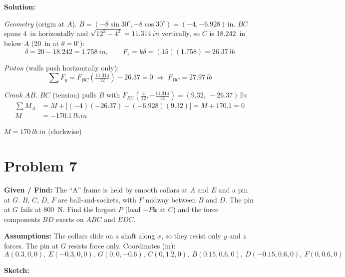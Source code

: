 \documentclass[11pt]{article}
\newcommand{\problemhead}[2]{%
    \clearpage
    \section*{Problem #1}
    \textbf{Given / Find:} #2
}
\begin{document}
\textbf{Solution:}

\textit{Geometry} (origin at $A$). $B = (-8\sin30^\circ, -8\cos30^\circ) = (-4, -6.928)$\,in. $BC$ spans \SI{4}{in} horizontally and $\sqrt{12^2 - 4^2} = \SI{11.314}{in}$ vertically, so $C$ is \SI{18.242}{in} below $A$ (\SI{20}{in} at $\theta = 0^\circ$):
\[
\delta = 20 - 18.242 = \SI{1.758}{in}, \qquad F_s = k\delta = (15)(1.758) = \SI{26.37}{lb}
\]

\textit{Piston} (walls push horizontally only):
\[
\textstyle\sum F_y = F_{BC}\left(\tfrac{11.314}{12}\right) - 26.37 = 0 \;\Rightarrow\; F_{BC} = \SI{27.97}{lb}
\]

\textit{Crank $AB$.} $BC$ (tension) pulls $B$ with $F_{BC}\left(\tfrac{4}{12}, -\tfrac{11.314}{12}\right) = (9.32,\ -26.37)$\,lb:
\begin{align*}
\textstyle\sum M_A &= M + \big[(-4)(-26.37) - (-6.928)(9.32)\big] = M + 170.1 = 0\\
M &= \SI{-170.1}{lb.in}
\end{align*}

\begin{finalanswer}
$M = \SI{170}{lb.in}$ (clockwise)
\end{finalanswer}

\problemhead{7}{The ``A'' frame is held by smooth collars at $A$ and $E$ and a pin at $G$. $B$, $C$, $D$, $F$ are ball-and-sockets, with $F$ midway between $B$ and $D$. The pin at $G$ fails at \SI{800}{N}. Find the largest $P$ (load $-P\mathbf k$ at $C$) and the force components $BD$ exerts on $ABC$ and $EDC$.}

\textbf{Assumptions:} The collars slide on a shaft along $x$, so they resist only $y$ and $z$ forces. The pin at $G$ resists force only. Coordinates (m):
\[
A(0.3,0,0),\ E(-0.3,0,0),\ G(0,0,-0.6),\ C(0,1.2,0),\ B(0.15,0.6,0),\ D(-0.15,0.6,0),\ F(0,0.6,0)
\]

\textbf{Sketch:}
\end{document}
